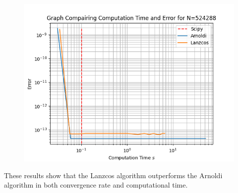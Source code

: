 \documentclass{article}
\begin{document}
\begin{figure}[H]
\begin{minipage}{0.5\textwidth}
	  \label{fig:MEe6}
       \centering
	  \includegraphics[width=\linewidth]{Plots/Comp Time v E Results for N=524288.png}
	  \label{fig:MEe6}
    \end{minipage}
\end{figure}
These results show that the Lanzcos algorithm outperforms the Arnoldi algorithm in both convergence rate and computational time.
\end{document}
